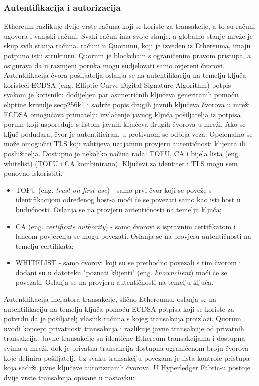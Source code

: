 \documentclass[times, utf8, diplomski]{fer}
\begin{document}
\subsubsection{Autentifikacija i autorizacija}
Ethereum razlikuje dvije vrste računa koji se koriste za transakcije, a to su računi ugovora i vanjski računi. Svaki račun ima svoje stanje, a globalno stanje mreže je skup svih stanja računa. računi u Quorumu, koji je izveden iz Ethereuma, imaju potpuno istu strukturu. Quorum je blockchain s ograničenim pravom pristupa, a osigurava da u razmjeni poruka mogu sudjelovati samo ovjereni čvorovi. Autentifikacija čvora pošiljatelja oslanja se na autentifikaciju na temelju ključa koristeći ECDSA (eng. Elliptic Curve Digital Signature Algorithm) potpis - svakom je korisniku dodijeljen par asimetričnih ključeva generiranih pomoću eliptine krivulje secp256k1 i sadrže popis drugih javnih ključeva čvorova u mreži.  \cite{johnson2001elliptic} ECDSA omogućava primatelju izvlačenje javnog ključa pošiljatelja iz potpisa poruke koji uspoređuje s listom javnih ključeva drugih čvorova u mreži. Ako se ključ podudara, čvor je autentificiran, u protivnom se odbija veza. Opcionalno se može omogućiti TLS koji zahtijeva uzajamnu provjeru autentičnosti klijenta ili poslužitelja. Dostupno je nekoliko načina rada: TOFU, CA i bijela lista (eng. whitelist) (TOFU i CA kombinirano). Ključevi za identitet i TLS mogu sem ponovno iskoristiti.

\begin{itemize}

\item TOFU (eng.  \textit{trust-on-first-use}) - samo prvi čvor koji se poveže s identifikacijom određenog host-a moći će se povezati samo kao isti host u budućnosti. Oslanja se na provjeru autentičnosti na temelju ključa;

\item CA (eng.  \textit{certificate authority}) - samo čvorovi s ispravnim certifikatom i lancom povjerenja se mogu povezati. Oslanja se na provjeru autentičnosti na temelju certifikata;

\item WHITELIST - samo čvorovi koji su se prethodno povezali s tim čvorom i dodani su u datoteku "poznati klijenti" (eng.  \textit{knownclient}) moći će se povezati.  Oslanja se na provjeru autentičnosti na temelju ključa.

\end{itemize}

Autentifikacija incijatora transakcije, slično Ethereumu, oslanja se na autentifikaciju na temelju ključa pomoću ECDSA potpisa koji se koriste za potvrdu da je pošiljatelj vlasnik računa s kojeg transakcija proizlazi. Quorum uvodi koncept privatnosti transakcija i razlikuje javne transakcije od privatnih transakcija. Javne transakcije su identične Ethereum transakcijama i dostupna svima u mreži, dok je privatna transakcija dostupna ograničenom broju čvorova koje definira pošiljatelj. Uz svaku transakciju povezana je lista kontrole pristupa koja sadrži javne ključeve autoriziranih čvorova.
U Hyperledger Fabric-u postoje dvije vrste transakcija opisane u nastavku:
\end{document}
